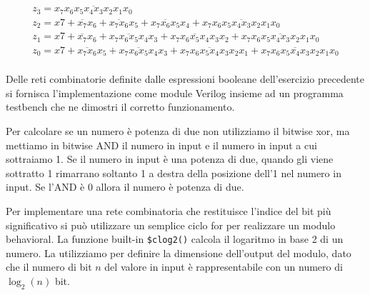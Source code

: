 \begin{exrc}
	\begin{equation*}
		\begin{aligned}
		z_3 = \overbar{x_7x_6x_5x_4x_3x_2x_1x_0} \\
		z_2 = x7 + \overbar{x_7}x_6 + \overbar{x_7x_6}x_5 + \overbar{x_7x_6x_5}x_4 + \overbar{x_7x_6x_5x_4x_3x_2x_1x_0} \\
		z_1 = x7 + \overbar{x_7}x_6 + \overbar{x_7x_6x_5x_4}x_3 + \overbar{x_7x_6x_5x_4x_3}x_2 + \overbar{x_7x_6x_5x_4x_3x_2x_1x_0} \\
		z_0 = x7 + \overbar{x_7x_6}x_5 + \overbar{x_7x_6x_5x_4}x_3 + \overbar{x_7x_6x_5x_4x_3x_2}x_1 + \overbar{x_7x_6x_5x_4x_3x_2x_1}x_0 \\
		\end{aligned}
	\end{equation*}
\end{exrc}

\begin{exrc}
	Delle reti combinatorie definite dalle espressioni booleane dell’esercizio precedente si fornisca l’implementazione come module Verilog insieme ad un programma testbench che ne dimostri il corretto funzionamento.
	
	Per calcolare se un numero è potenza di due non utilizziamo il bitwise xor, ma mettiamo in bitwise AND il numero in input e il numero in input a cui sottraiamo 1. Se il numero in input è una potenza di due, quando gli viene sottratto 1 rimarrano soltanto 1 a destra della posizione dell'1 nel numero in input. Se l'AND è 0 allora il numero è potenza di due.

	
	
	
	Per implementare una rete combinatoria che restituisce l'indice del bit più significativo si può utilizzare un semplice ciclo for per realizzare un modulo behavioral. La funzione built-in \verb|$clog2()| calcola il logaritmo in base 2 di un numero. La utilizziamo per definire la dimensione dell'output del modulo, dato che il numero di bit $ n $ del valore in input è rappresentabile con un numero di $ \log_2(n) $ bit.
	
	
	
	
\end{exrc}

